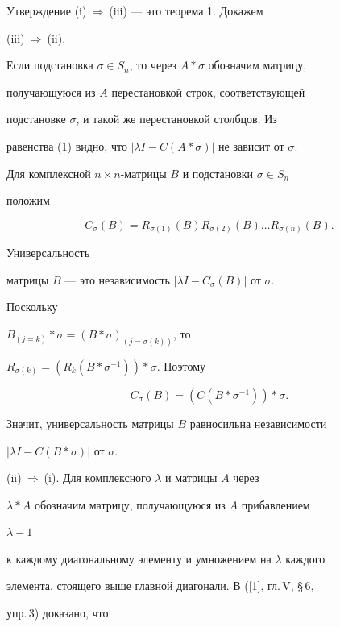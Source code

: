 \begin{pf} 


Утверждение (i)$\ \Rightarrow\ $(iii) --- это теорема 1. Докажем 


(iii)$\ \Rightarrow\ $(ii). 


Если подстановка $\sigma\in S_n$, то через $A\ast\sigma$ обозначим матрицу, 


получающуюся из $A$ перестановкой строк, соответствующей  


подстановке $\sigma$, и такой же перестановкой столбцов. Из 


равенства (1) видно, что $|\lambda I-C(A\ast\sigma)|$ не зависит от $\sigma$. 


 


Для комплексной $n\times n$-матрицы $B$ и подстановки $\sigma\in S_n$ 


положим


$$


C_\sigma(B)=R_{\sigma(1)}(B) R_{\sigma(2)}(B) \dotsc 


R_{\sigma(n)}(B).


$$


Универсальность 


матрицы $B$ --- это независимость $|\lambda I-C_\sigma(B)|$ от $\sigma$. 


Поскольку 


$B_{(j=k)}\ast\sigma=(B\ast\sigma)_{(j=\sigma(k))}$, то 


$R_{\sigma(k)}=(R_k(B\ast\sigma^{-1}))\ast\sigma$. Поэтому 


$$ 


C_\sigma(B)=(C(B\ast\sigma^{-1}))\ast\sigma. 


$$ 


Значит, универсальность матрицы $B$ равносильна независимости 


$|\lambda I-C(B\ast\sigma)|$ от $\sigma$. 


 


(ii)$\ \Rightarrow\ $(i). Для комплексного $\lambda$ и матрицы $A$ через 


$\lambda\ast A$ обозначим матрицу, получающуюся из $A$ прибавлением 


$\lambda-1$ 


к каждому диагональному элементу и умножением на $\lambda$ каждого 


элемента, стоящего выше главной диагонали. В ([1], гл.\,V, \S\,6, 


упр.\,3) доказано, что 



\end{pf}
